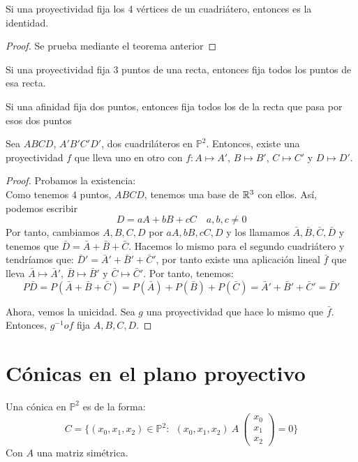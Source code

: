 \begin{nprop}
	Si una proyectividad fija los 4 vértices de un cuadriátero, entonces es la identidad.
\end{nprop}
\begin{proof}
	Se prueba mediante el teorema anterior
\end{proof}
\begin{nprop}
	Si una proyectividad fija 3 puntos de una recta, entonces fija todos los puntos de esa recta.
\end{nprop}

\begin{nprop}
	Si una afinidad fija dos puntos, entonces fija todos los de la recta que pasa por esos dos puntos

\end{nprop}
\begin{nth}
	Sea $ABCD$, $A'B'C'D'$, dos cuadriláteros en $\mathbb P^2$. Entonces, existe una proyectividad $f$ que lleva uno en otro con $f:A\mapsto A'$, $B\mapsto B'$, $C \mapsto C'$ y $D\mapsto D'$.
\end{nth}
\begin{proof}
	Probamos la existencia:\\
	Como tenemos 4 puntos, $ABCD$, tenemos una base de $\mathbb{R}^3$ con ellos. Así, podemos escribir
	\[
	D = aA + bB +cC \quad a,b,c\ne 0
	\]
	Por tanto, cambiamos $A,B,C,D$ por $aA,bB,cC,D$ y los llamamos $\bar A,\bar B, \bar C, \bar D$ y tenemos que $\bar D = \bar A + \bar B + \bar C$. Hacemos lo mismo para el segundo cuadriátero y tendríamos que:
	$\bar D ' = \bar A ' + \bar B ' + \bar C'$, por tanto existe una aplicación lineal $\bar f$ que lleva $\bar A \mapsto \bar A '$, $\bar B \mapsto \bar B'$ y $\bar C \mapsto \bar C'$. Por tanto, tenemos:
	\[
	P{\bar D} = P( \bar A + \bar B + \bar C) = P(\bar A) + P(\bar B) + P(\bar C) = \bar A ' + \bar B ' + \bar C' = \bar D'
	\]

	Ahora, vemos la unicidad. Sea $g$ una proyectividad que hace lo mismo que $\bar f$. Entonces, $g^{-1} o f$ fija $A,B,C,D$.
\end{proof}

\section{Cónicas en el plano proyectivo}

Una cónica en $\mathbb P^2$  es de la forma:
\[
C = \{(x_0,x_1,x_2) \in \mathbb P^2 : \ \ (x_0,x_1,x_2) \ A \ \begin{pmatrix}
x_0\\
x_1\\
x_2
\end{pmatrix} = 0 \}
\]
Con $A$ una matriz simétrica.

